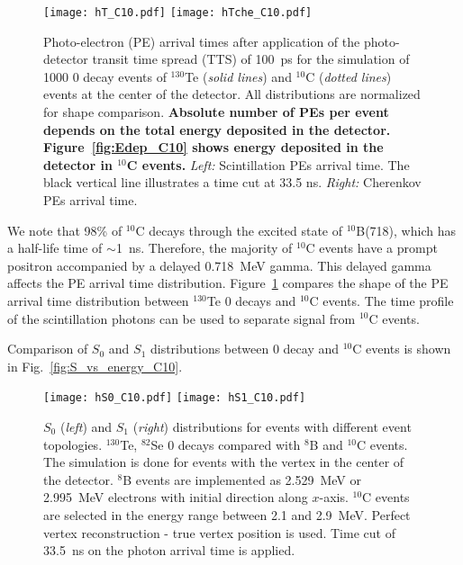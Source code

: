 \begin{figure}[h]
  \centering
  \texttt{[image: hT\_C10.pdf]}
  \texttt{[image: hTche\_C10.pdf]}
  \caption{Photo-electron (PE) arrival times after application of the
    photo-detector transit time spread (TTS) of 100~ps for the
    simulation of 1000 0{\nbb} decay events of $^{130}$Te (\emph{solid
      lines}) and $^{10}$C (\emph{dotted lines}) events at the center
    of the detector. All distributions are normalized for shape
    comparison. {\bf Absolute number of PEs per event depends on the
      total energy deposited in the
      detector. Figure~\ref{fig:Edep_C10} shows energy deposited in
      the detector in $^{10}$C events.} \emph{Left:} Scintillation PEs
    arrival time. The black vertical line illustrates a time cut at
    33.5 ns. \emph{Right:} Cherenkov PEs arrival time.}
\label{fig:Arrival_time_C10}
\end{figure}

We note that 98\% of $^{10}$C decays through the excited state of
$^{10}$B(718), which has a half-life time of $\sim$1~ns. Therefore, the
majority of $^{10}$C events have a prompt positron accompanied by a
delayed 0.718~MeV gamma. This delayed gamma affects the PE arrival time
distribution. Figure~\ref{fig:Arrival_time_C10} compares the shape of the
PE arrival time distribution between $^{130}$Te 0{\nbb} decays and
$^{10}$C events. The time profile of the scintillation photons can be used
to separate signal from $^{10}$C events.



Comparison of $S_0$ and $S_1$ distributions between 0{\nbb} decay and
$^{10}$C events is shown in Fig.~\ref{fig:S_vs_energy_C10}.

\begin{figure*}[h]
\centering
\texttt{[image: hS0\_C10.pdf]}
\texttt{[image: hS1\_C10.pdf]}
\caption{$S_0$ (\emph{left}) and $S_1$ (\emph{right}) distributions
  for events with different event topologies. $^{130}$Te, $^{82}$Se 0{\nbb} 
  decays compared with $^{8}$B and $^{10}$C events. The simulation is done 
  for events with the vertex in the center of the detector. $^{8}$B events 
  are implemented as 2.529~MeV or 2.995~MeV electrons with initial direction 
  along $x$-axis. $^{10}$C events are selected in the energy range between 2.1 
  and 2.9~MeV. Perfect vertex reconstruction - true vertex position is used. 
  Time cut of 33.5~ns on the photon arrival time is applied.}
\label{fig:S_vs_energy}
\end{figure*}


